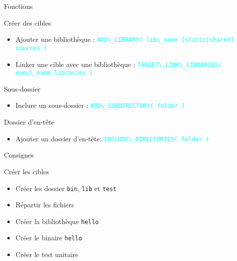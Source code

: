 \documentclass{beamer}
\begin{document}
\begin{frame}[fragile]{Fonctions}
  \begin{block}{Créer des cibles}
    \begin{itemize}
    \item Ajouter une bibliothèque :\linebreak
      \textcolor{cyan}{\verb?ADD\_LIBRARY( lib\_name [static|shared] sources )?}
    \item Linker une cible avec une bibliothèque :\linebreak
      \textcolor{cyan}{\verb?TARGET\_LINK\_LIBRARIES( exec\_name libraries )?}%
    \end{itemize}
  \end{block}

  \begin{block}{Sous-dossier}
    \begin{itemize}
    \item Inclure un sous-dossier :\linebreak
      \textcolor{cyan}{\verb?ADD\_SUBDIRECTORY( folder )?}
    \end{itemize}
  \end{block}  

  \begin{block}{Dossier d'en-tête}
    \begin{itemize}
    \item Ajouter un dossier d'en-tête:\linebreak
      \textcolor{cyan}{\verb?INCLUDE\_DIRECTORIES( folder )?}
    \end{itemize}
  \end{block}
  
\end{frame}

\begin{frame}[fragile]{Consignes}
  \begin{exampleblock}{Créer les cibles}
    \begin{itemize}
    \item Créer les dossier \verb?bin?, \verb?lib? et \verb?test?
    \item Répartir les fichiers
    \item Créer la bibliothèque \verb?hello?
    \item Créer le binaire \verb?hello?
    \item Créer le test unitaire
    \end{itemize}
  \end{exampleblock}
\end{frame}
\end{document}
